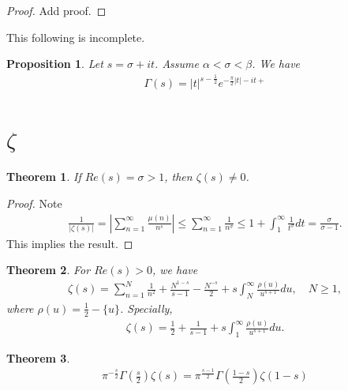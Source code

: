 \documentclass[a4paper,10pt]{amsart}
\newtheorem{theorem}{Theorem}[section]
\newtheorem{proposition}{Proposition}[section]
\begin{document}
\begin{proof}
   Add proof. 
\end{proof}


This following is incomplete.
\begin{proposition}
   Let $s = \sigma + it$. Assume $\alpha < \sigma < \beta$. We have
   \begin{align*}
       \Gamma(s) = |t|^{s - \frac{1}{2}} e^{-\frac{\pi}{2}|t| -it +
       } 
   \end{align*}
\end{proposition}


\section{$\zeta$}

\begin{theorem}
    If $Re(s) = \sigma > 1$, then $\zeta(s) \neq 0$.
\end{theorem}

\begin{proof}
    Note 
   \begin{align*}
       \frac{1}{|\zeta(s)|} = |\sum^{\infty}_{n=1} \frac{\mu(n)}{n^{s}}|
       \leq \sum^{\infty}_{n=1}\frac{1}{n^{\sigma}} \leq 
       1 + \int^{\infty}_{1} \frac{1}{t^{\sigma}} dt 
       = \frac{\sigma}{\sigma-1}.
   \end{align*}
   This implies the result. 
\end{proof}

\begin{theorem}
    For $Re(s) > 0$, we have
   \begin{align*}
       \zeta(s) = \sum^{N}_{n=1}\frac{1}{n^{2}} + \frac{N^{1-s}}{s-1} 
       -\frac{N^{-s}}{2} + s \int^{\infty}_{N} \frac{\rho(u)}{u^{s+1}}d u,
       \quad N \geq 1,
   \end{align*}
   where $\rho(u) = \frac{1}{2} - \{u\}$.
   Specially, 
   \begin{align*}
       \zeta(s) = \frac{1}{2} + \frac{1}{s-1} 
       + s \int^{\infty}_{1} \frac{\rho(u)}{u^{s+1}}d u.
   \end{align*}

\end{theorem}

\begin{theorem}
\begin{align*}
\pi^{-\frac{s}{2}} \Gamma(\frac{s}{2})\zeta(s) =  
\pi^{\frac{s-1}{2}} \Gamma(\frac{1-s}{2})\zeta(1-s)
\end{align*}
\end{theorem}
\end{document}
